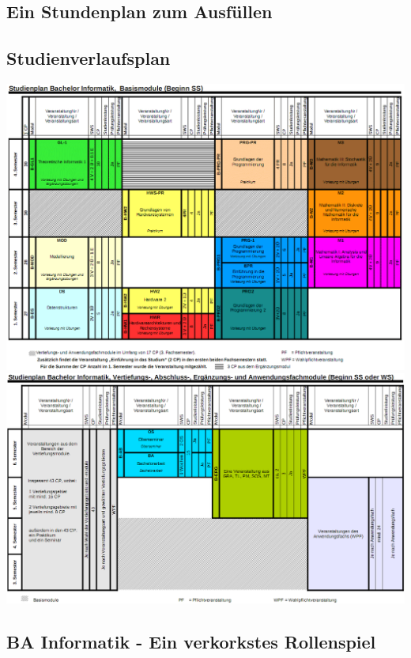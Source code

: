 \documentclass[12pt,a4paper]{scrartcl}
\newcommand{\spaltenanfang}{\begin{multicols}{2}}
\newcommand{\spaltenende}{\end{multicols}}
\begin{document}
\subsection{Ein Stundenplan zum Ausfüllen}

\subsection{Studienverlaufsplan}
\includegraphics[width=18cm]{bilder/basismodulebachelorSS}
\newline
\includegraphics[width=18cm]{bilder/sonstigemodulebachelor}
\newpage
\subsection{BA Informatik - Ein verkorkstes Rollenspiel}
\spaltenanfang

\spaltenende
\newpage
\end{document}
